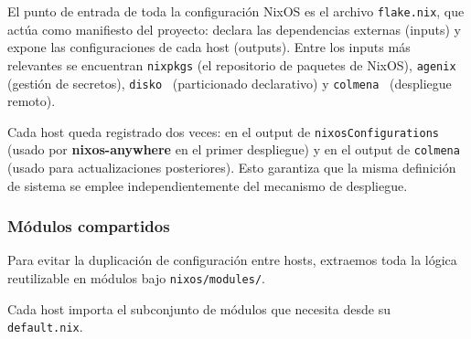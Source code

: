 \documentclass[a4paper, 11pt]{article}
\begin{document}
El punto de entrada de toda la configuración NixOS es el archivo \texttt{flake.nix}, que 
actúa como manifiesto del proyecto: declara las dependencias externas (inputs) y 
expone las configuraciones de cada host (outputs). Entre los inputs más relevantes 
se encuentran \texttt{nixpkgs} (el repositorio de paquetes de NixOS), \texttt{agenix}~\cite{agenix} 
(gestión de secretos), \texttt{disko}~\cite{disko} (particionado declarativo) y 
\texttt{colmena}~\cite{colmena} (despliegue remoto).

Cada host queda registrado dos veces: en el output de \texttt{nixosConfigurations} 
(usado por \textbf{nixos-anywhere} en el primer despliegue) y en el output de
\texttt{colmena} (usado para actualizaciones posteriores). Esto garantiza que la 
misma definición de sistema se emplee independientemente del mecanismo de despliegue.

\subsubsection{Módulos compartidos}

Para evitar la duplicación de configuración entre hosts, extraemos toda la 
lógica reutilizable en módulos bajo \texttt{nixos/modules/}. 

Cada host importa el subconjunto de módulos que necesita desde su \texttt{default.nix}.
\end{document}
